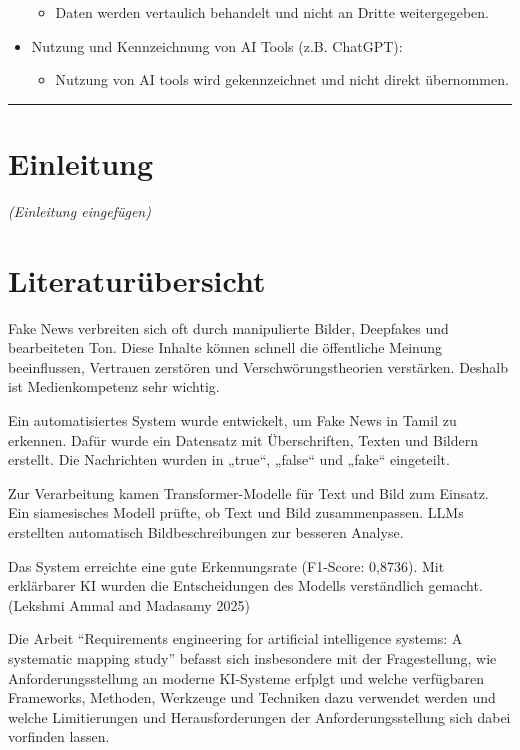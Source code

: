 \documentclass[
  12pt,
  a4paper,
]{article}
\providecommand{\tightlist}{%
  \setlength{\itemsep}{0pt}\setlength{\parskip}{0pt}}\usepackage{longtable,booktabs,array}
\begin{document}
\begin{itemize}
  \begin{itemize}
  \tightlist
  \item
    Daten werden vertaulich behandelt und nicht an Dritte weitergegeben.
  \end{itemize}
\item
  Nutzung und Kennzeichnung von AI Tools (z.B. ChatGPT):

  \begin{itemize}
  \tightlist
  \item
    Nutzung von AI tools wird gekennzeichnet und nicht direkt
    übernommen.
  \end{itemize}
\end{itemize}

\begin{center}\rule{0.5\linewidth}{0.5pt}\end{center}

\section{Einleitung}\label{einleitung}

\emph{(Einleitung eingefügen)}

\section{Literaturübersicht}\label{literaturuxfcbersicht}

Fake News verbreiten sich oft durch manipulierte Bilder, Deepfakes und
bearbeiteten Ton. Diese Inhalte können schnell die öffentliche Meinung
beeinflussen, Vertrauen zerstören und Verschwörungstheorien verstärken.
Deshalb ist Medienkompetenz sehr wichtig.

Ein automatisiertes System wurde entwickelt, um Fake News in Tamil zu
erkennen. Dafür wurde ein Datensatz mit Überschriften, Texten und
Bildern erstellt. Die Nachrichten wurden in „true``, „false`` und
„fake`` eingeteilt.

Zur Verarbeitung kamen Transformer-Modelle für Text und Bild zum
Einsatz. Ein siamesisches Modell prüfte, ob Text und Bild
zusammenpassen. LLMs erstellten automatisch Bildbeschreibungen zur
besseren Analyse.

Das System erreichte eine gute Erkennungsrate (F1-Score: 0,8736). Mit
erklärbarer KI wurden die Entscheidungen des Modells verständlich
gemacht. (Lekshmi Ammal and Madasamy 2025)

Die Arbeit ``Requirements engineering for artificial intelligence
systems: A systematic mapping study'' befasst sich insbesondere mit der
Fragestellung, wie Anforderungsstellung an moderne KI-Systeme erfplgt
und welche verfügbaren Frameworks, Methoden, Werkzeuge und Techniken
dazu verwendet werden und welche Limitierungen und Herausforderungen der
Anforderungsstellung sich dabei vorfinden lassen.
\end{document}
